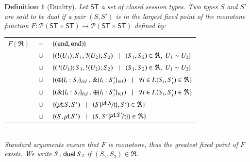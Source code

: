\documentclass[preprint,11pt]{elsarticle}
\newtheorem{definition}{Definition}[section]
\begin{document}
\begin{definition}[Duality]
\label{def:dual}
Let $\mathsf{ST}$ a set of closed session types. 
Two types $S$ and $S'$ are said to be {\em dual} if a pair $(S,S')$ is 
in the largest fixed point of the monotone function
$F:\mathcal{P}(\mathsf{ST}\times \mathsf{ST}) \to 
\mathcal{P}(\mathsf{ST}\times \mathsf{ST})$ defined by:\\[1mm]
\begin{tabular}{rcl}
$F(\Re)$ &$\!\!=\!\!$&	$\{(\mathtt{end}, \mathtt{end})\}$\\
         &$\!\!\cup\!\!$&	$\{(! \langle U_1 \rangle ; S_1, ? (U_2) ; S_2)
\;\;\;|\;\;\;(S_1, S_2)\in \Re, \  U_1 \sim U_2 \}$\\ 
       &$\!\!\cup\!\!$&	$\{(? (U_1) ; S_1, ! \langle U_2 \rangle ; S_2)
\;\;\;|\;\;\;(S_1, S_2)\in \Re, \ U_1 \sim U_2\}$\\ 
	&$\!\!\cup\!\!$&	$\{(\oplus \{l_i: S_i\}_{i \in I} \,,\, \& \{l_i: S_i'\}_{i \in I}) \;\;\;|\;\;\; \forall i\in I. (S_i, S_i')\in \Re\}$\\
	&$\!\!\cup\!\!$&	$\{(\& \{l_i: S_i\}_{i \in I}\,,\, \oplus \{l_i: S_i'\}_{i \in I}) \;\;\;|\;\;\; \forall i\in I. (S_i, S_i')\in \Re\}$\\
	&$\!\!\cup\!\!$&	$\set{(\trec{t}{S}, S')
\bnfbar (S\subst{\trec{t}{S}}{\vart{t}},S')\in \Re}$\\
	&$\!\!\cup\!\!$&	$\set{(S,\trec{t}{S'})
\bnfbar (S,S'\subst{\trec{t}{S'}}{\vart{t}})\in \Re}$\\[1mm]
\end{tabular}
\\
\noindent
Standard arguments ensure that $F$ is monotone, thus the greatest fixed point
of $F$ exists. We write $S_1 \ \mathsf{dual}\  S_2$ if  $(S_1,S_2)\in \Re$. 
\end{definition}


\end{document}
